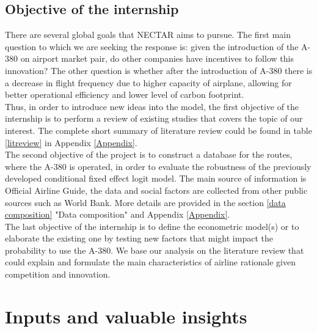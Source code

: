 \documentclass[titlepage, 11pt]{article}
\begin{document}
\subsection{Objective of the internship} \label{Objective Internship}
\tab There are several global goals that NECTAR aims to pursue. The first main question to which we are seeking the response is: given the introduction of the A-380 on airport market pair, do other companies have incentives to follow this innovation? The other question is whether after the introduction of A-380 there is a decrease in flight frequency due to higher capacity of airplane, allowing for better operational efficiency and lower level of carbon footprint. \\
\tab Thus, in order to introduce new ideas into the model, the first objective of the internship is to perform a review of existing studies that covers the topic of our interest. The complete short summary of literature review could be found in table \ref{litreview} in Appendix \ref{Appendix}. \\
\tab The second objective of the project is to construct a database for the routes, where the A-380 is operated, in order to evaluate the robustness of the previously developed conditional fixed effect logit model. The main source of information is Official Airline Guide\cite{OAG}, the data and social factors are collected from other public sources such as World Bank. More details are provided in the section \ref{data composition} "Data composition" and Appendix \ref{Appendix}. \\
\tab The last objective of the internship is to define the econometric model(s) or to elaborate the existing one by testing new factors that might impact the probability to use the A-380. We base our analysis on the literature review that could explain and formulate the main characteristics of airline rationale given competition and innovation. 


\section{Inputs and valuable insights}\label{inputs}
\end{document}
